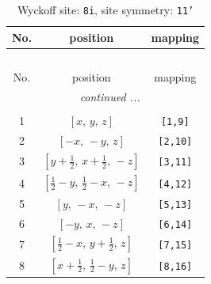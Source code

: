 \documentclass[fleqn,8pt]{jsarticle}
\begin{document}
\renewcommand{\arraystretch}{1.2}
\begin{longtable}{ccc}
\caption{Wyckoff site: {\tt 8i}, site symmetry: {\tt 11'}}
 \\
 \hline \hline
No. & position & mapping \\ \hline \endfirsthead

\multicolumn{2}{l}{\tablename\ \thetable{}} \\
 \hline \hline
No. & position & mapping \\ \hline \endhead

 \hline \hline
\multicolumn{2}{r}{\footnotesize\it continued ...} \\ \endfoot

 \hline \hline
\multicolumn{2}{r}{} \\ \endlastfoot

1 & $\left[ x,\, y,\, z \right]$ & {\tt [1,9]} \\ \hline
2 & $\left[ - x,\, - y,\, z \right]$ & {\tt [2,10]} \\ \hline
3 & $\left[ y + \frac{1}{2},\, x + \frac{1}{2},\, - z \right]$ & {\tt [3,11]} \\ \hline
4 & $\left[ \frac{1}{2} - y,\, \frac{1}{2} - x,\, - z \right]$ & {\tt [4,12]} \\ \hline
5 & $\left[ y,\, - x,\, - z \right]$ & {\tt [5,13]} \\ \hline
6 & $\left[ - y,\, x,\, - z \right]$ & {\tt [6,14]} \\ \hline
7 & $\left[ \frac{1}{2} - x,\, y + \frac{1}{2},\, z \right]$ & {\tt [7,15]} \\ \hline
8 & $\left[ x + \frac{1}{2},\, \frac{1}{2} - y,\, z \right]$ & {\tt [8,16]} \\
\end{longtable}
\end{document}
